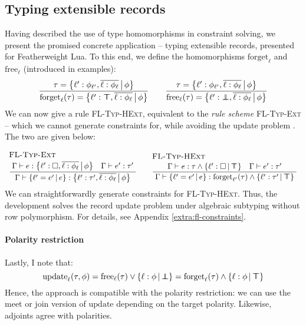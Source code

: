 \subsection{Typing extensible records}
\label{subsec:breaking-records}
Having described the use of type homomorphisms in constraint solving, we present the promised concrete application -- typing extensible records, presented for Featherweight Lua. To this end, we define the homomorphisms $\mathrm{forget}_\ell$ and $\mathrm{free}_\ell$ (introduced in examples):
$$ 
\dfrac
  {\tau = \flext{\ell' : \phi_{\ell'},  \overline{\ell : \phi_\ell}}{\phi}}
  {\mathrm{forget}_\ell(\tau) = \flext{\ell' : \flftop,  \overline{\ell : \phi_\ell}}{\phi}}
\qquad 
\dfrac
  {\tau = \flext{\ell' : \phi_{\ell'},  \overline{\ell : \phi_\ell}}{\phi}}
  {\mathrm{free}_\ell(\tau) = \flext{\ell' : \flfbot,  \overline{\ell : \phi_\ell}}{\phi}}
$$
We can now give a rule \textsc{FL-Typ-HExt}, equivalent to the \emph{rule scheme} \textsc{FL-Typ-Ext} -- which we cannot generate constraints for, while avoiding the update problem \cite{operations-on-records}. The two are given below:
$$
\irule{FL-Typ-Ext}
    {\Gamma \vdash e : \flext{\ell' : \flabsent, \overline{\ell : \phi_\ell}}{\phi} \quad \Gamma \vdash e' : \tau'}
    {\Gamma \vdash \flext{\ell' = e'}{e} : \flext{\ell' : \tau', \overline{\ell : \phi_\ell}}{\phi}}
\quad 
\irule{FL-Typ-HExt}{\Gamma \vdash e : \tau \meet \flext{\ell' : \flabsent}{\flftop} \quad \Gamma \vdash e' : \tau'}{\Gamma \vdash \flext{\ell' = e'}{e} : \mathrm{forget}_{\ell'}(\tau) \meet \flext{\ell' : \tau'}{\flftop}}
$$
We can straightforwardly generate constraints for 
\textsc{FL-Typ-HExt}.
Thus, the development solves the record update problem under algebraic subtyping without row polymorphism. For details, see Appendix \ref{extra:fl-constraints}.

\paragraph{Polarity restriction} Lastly, I note that:
$$ \mathrm{update}_\ell(\tau, \phi) = \mathrm{free}_\ell(\tau) \join \flext{ \ell : \phi }{\flfbot} = \mathrm{forget}_\ell(\tau) \meet \flext{ \ell : \phi }{\flftop}  $$ 
Hence, the approach is compatible with the polarity restriction: we can use the meet or join version of $\mathrm{update}$ depending on the target polarity. Likewise, adjoints agree with polarities.

